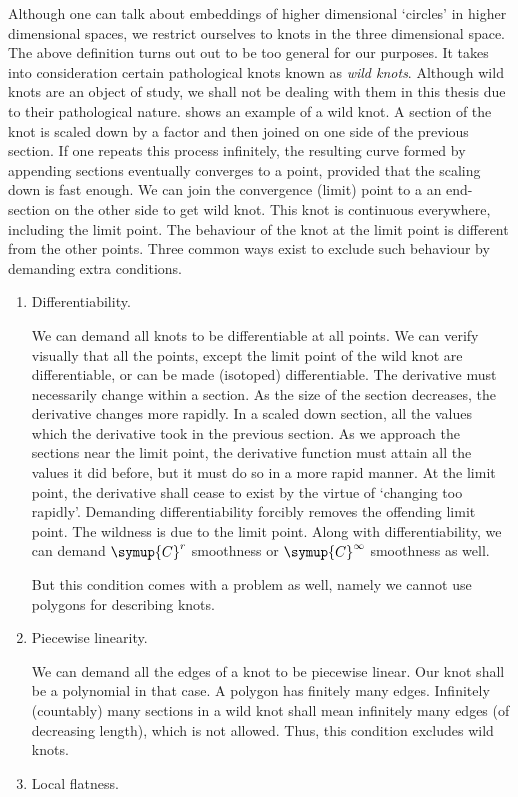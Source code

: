 Although one can talk about embeddings of higher dimensional `circles' in higher dimensional spaces, we restrict ourselves to knots in the three dimensional space. The above definition turns out out to be too general for our purposes. It takes into consideration certain pathological knots known as \textit{wild knots}. Although wild knots are an object of study, we shall not be dealing with them in this thesis due to their pathological nature.  shows an example of a wild knot. A section of the knot is scaled down by a factor and then joined on one side of the previous section. If one repeats this process infinitely, the resulting curve formed by appending sections eventually converges to a point, provided that the scaling down is fast enough. We can join the convergence (limit) point to a an end-section on the other side to get wild knot. This knot is continuous everywhere, including the limit point. The behaviour of the knot at the limit point is different from the other points. Three common ways exist to exclude such behaviour by demanding extra conditions.
\begin{enumerate}
    \item Differentiability.

    We can demand all knots to be differentiable at all points. We can verify visually that all the points, except the limit point of the wild knot are differentiable, or can be made (isotoped) differentiable. The derivative must necessarily change within a section. As the size of the section decreases, the derivative changes more rapidly. In a scaled down section, all the values which the derivative took in the previous section. As we approach the sections near the limit point, the derivative function must attain all the values it did before, but it must do so in a more rapid manner. At the limit point, the derivative shall cease to exist by the virtue of `changing too rapidly'. Demanding differentiability forcibly removes the offending limit point. The wildness is due to the limit point. Along with differentiability, we can demand \(\symup{C}^r\) smoothness or \(\symup{C}^\infty\) smoothness as well.

    But this condition comes with a problem as well, namely we cannot use polygons for describing knots.
    \item Piecewise linearity.

    We can demand all the edges of a knot to be piecewise linear. Our knot shall be a polynomial in that case. A polygon has finitely many edges. Infinitely (countably) many sections in a wild knot shall mean infinitely many edges (of decreasing length), which is not allowed. Thus, this condition excludes wild knots.
    \item Local flatness.
\end{enumerate}
